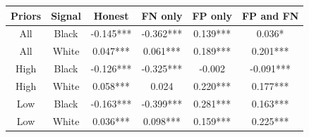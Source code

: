 \begin{table}[H]\centering \begin{tabular}{cccccc} \hline \hline
\textbf{Priors}&\textbf{Signal}&\textbf{Honest}&\textbf{FN only}&\textbf{FP only}&\textbf{FP and FN}\\ \hline
All&Black&-0.145***&-0.362***&0.139***&0.036*\\
All&White&0.047***&0.061***&0.189***&0.201***\\
High&Black&-0.126***&-0.325***&-0.002&-0.091***\\
High&White&0.058***&0.024&0.220***&0.177***\\
Low&Black&-0.163***&-0.399***&0.281***&0.163***\\
Low&White&0.036***&0.098***&0.159***&0.225***\\
\hline \end{tabular} \end{table}
